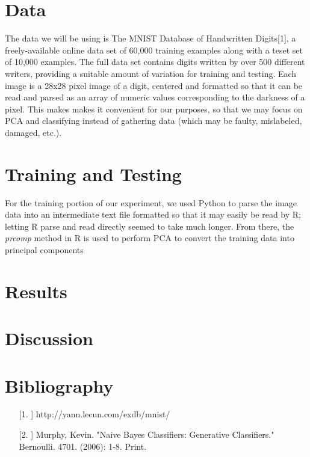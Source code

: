 \documentclass[twocolumn]{article}
\begin{document}

\section{Data} %
\label{sec:data}
The data we will be using is The MNIST Database of Handwritten Digits[1], a freely-available online data set of 60,000 training examples along with a teset set of 10,000 examples. The full data set contains digits written by over 500 different writers, providing a suitable amount of variation for training and testing. Each image is a 28x28 pixel image of a digit, centered and formatted so that it can be read and parsed as an array of numeric values corresponding to the darkness of a pixel. This makes makes it convenient for our purposes, so that we may focus on PCA and classifying instead of gathering data (which may be faulty, mislabeled, damaged, etc.). 

\section{Training and Testing} %
\label{sec:training_and_testing}
For the training portion of our experiment, we used Python to parse the image data into an intermediate text file formatted so that it may easily be read by R; letting R parse and read directly seemed to take much longer. From there, the \emph{prcomp} method in R is used to perform PCA to convert the training data into principal components

\section{Results} %
\label{sec:results}

\section{Discussion} %
\label{sec:discussion}

\section{Bibliography} %
\label{sec:bibliography}
\begin{enumerate}
\item[[1.]] http://yann.lecun.com/exdb/mnist/
\item[[2.]] Murphy, Kevin. "Naive Bayes Classifiers: Generative Classifiers." Bernoulli. 4701. (2006): 1-8. Print.
\end{enumerate}


\end{document}
